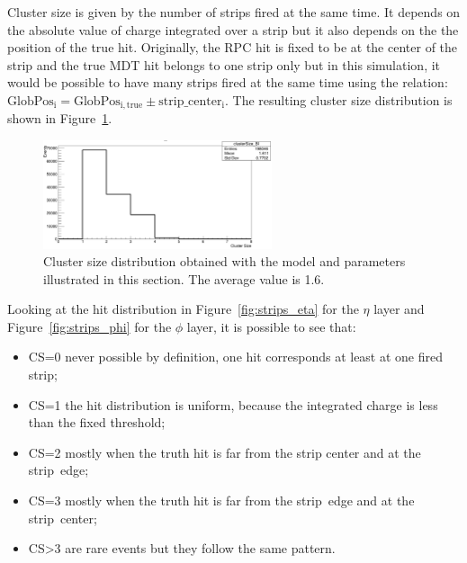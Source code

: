 Cluster size is given by the number of strips fired at the same time. It depends on the absolute value of charge integrated over a strip but it also depends on the the position of the true hit.
Originally, the RPC hit is fixed to be at the center of the strip and the true MDT hit belongs to one strip only but in this simulation, it would be possible to have many strips fired at the same time using the relation: $\mathrm{GlobPos_{i} = GlobPos_{i,true}\pm strip\_center_{i}}$. 
The resulting cluster size distribution is shown in Figure~\ref{fig:CS}.
\begin{figure}[!h]
	\centering
	\includegraphics[width=0.6\textwidth]{Chapters/CH3/figures/CS}
	\caption{Cluster size distribution obtained with the model and parameters illustrated in this section. The average value is 1.6.}
	\label{fig:CS}
\end{figure}
\newpage\phantom{}
\noindent Looking at the hit distribution in Figure~\ref{fig:strips_eta} for the $\eta$ layer and Figure~\ref{fig:strips_phi} for the $\phi$ layer, it is possible to see that:
\begin{itemize}
\item CS=0 never possible by definition, one hit corresponds at least at one fired strip;
\item CS=1 the hit distribution is uniform, because the integrated charge is less than the fixed threshold;
\item CS=2 mostly when the truth hit is far from the strip center and at the strip~edge;
\item CS=3 mostly when the truth hit is far from the strip~edge and at the strip~center;
\item CS>3 are rare events but they follow the same pattern.
\end{itemize}
